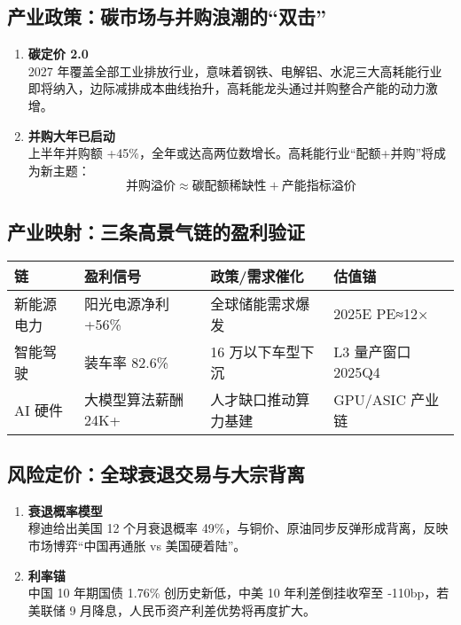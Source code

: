 \subsection{产业政策：碳市场与并购浪潮的“双击”}
\begin{enumerate}[leftmargin=*, nosep]
    \item \textbf{碳定价 2.0}  \\
    2027 年覆盖全部工业排放行业，意味着钢铁、电解铝、水泥三大高耗能行业即将纳入，边际减排成本曲线抬升，高耗能龙头通过并购整合产能的动力激增。
    
    \item \textbf{并购大年已启动}  \\
    上半年并购额 +45\%，全年或达高两位数增长。高耗能行业“配额+并购”将成为新主题：  
    \[
        \text{并购溢价} \approx \text{碳配额稀缺性} + \text{产能指标溢价}
    \]
\end{enumerate}

\subsection{产业映射：三条高景气链的盈利验证}
\begin{longtable}{@{}llll@{}}
\toprule
链 & 盈利信号 & 政策/需求催化 & 估值锚 \\ \midrule
新能源电力 & 阳光电源净利 +56\% & 全球储能需求爆发 & 2025E PE≈12× \\
智能驾驶 & 装车率 82.6\% & 16 万以下车型下沉 & L3 量产窗口 2025Q4 \\
AI 硬件 & 大模型算法薪酬 24K+ & 人才缺口推动算力基建 & GPU/ASIC 产业链 \\ \bottomrule
\end{longtable}

\subsection{风险定价：全球衰退交易与大宗背离}
\begin{enumerate}[leftmargin=*, nosep]
    \item \textbf{衰退概率模型}  \\
    穆迪给出美国 12 个月衰退概率 49\%，与铜价、原油同步反弹形成背离，反映市场博弈“中国再通胀 vs 美国硬着陆”。
    
    \item \textbf{利率锚}  \\
    中国 10 年期国债 1.76\% 创历史新低，中美 10 年利差倒挂收窄至 ‑110bp，若美联储 9 月降息，人民币资产利差优势将再度扩大。
\end{enumerate}

